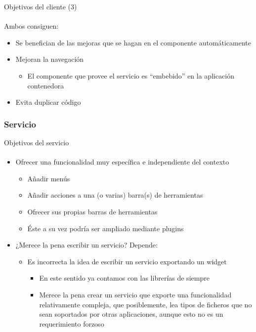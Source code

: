 \documentclass[12pt]{beamer}
\begin{document}
\begin{frame}{Objetivos del cliente (3)}
 \framesubtitle{}
 Ambos consiguen:
 \medskip
 \begin{itemize}
   \item Se benefician de las mejoras que se hagan en el componente automáticamente
   \item Mejoran la navegación
   \begin{itemize}
     \item El componente que provee el servicio es ``embebido'' en la aplicación contenedora
   \end{itemize}
   \item Evita duplicar código
 \end{itemize}
\end{frame}

\subsubsection{Servicio}

\begin{frame}{Objetivos del servicio}
  \framesubtitle{}
  \begin{itemize}
    \item Ofrecer una funcionalidad muy específica e independiente del contexto
    \begin{itemize}
      \item Añadir menús
      \item Añadir acciones a una (o varias) barra(s) de herramientas
      \item Ofrecer sus propias barras de herramientas
      \item Éste a su vez podría ser ampliado mediante plugins
    \end{itemize}
  \end{itemize}
  \begin{itemize}
    \item ¿Merece la pena escribir un servicio? Depende:
    \begin{itemize}
      \item Es incorrecta la idea de escribir un servicio exportando un widget
        \begin{itemize}
          \item En este sentido ya contamos con las librerías de siempre
          \item Merece la pena crear un servicio que exporte una funcionalidad relativamente
                compleja, que posiblemente, lea tipos de ficheros que no sean soportados por otras
                aplicaciones, aunque esto no es un requerimiento forzoso
        \end{itemize}
    \end{itemize}
  \end{itemize}
\end{frame}
\end{document}
